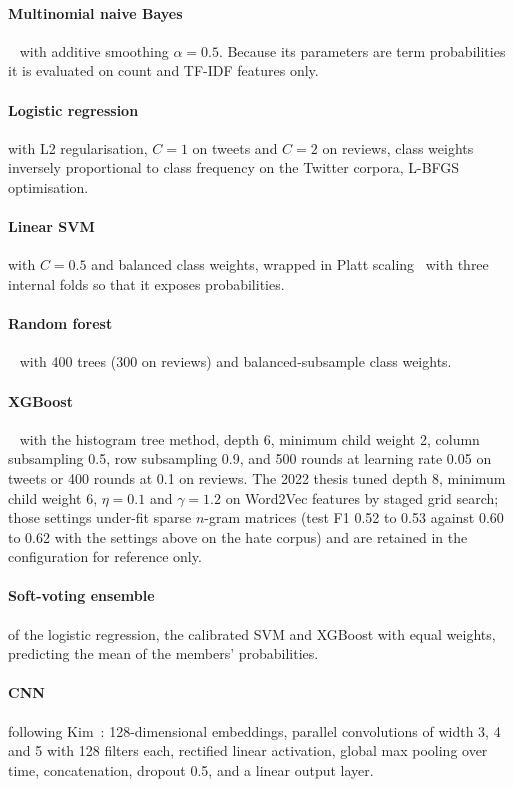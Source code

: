 \paragraph{Multinomial naive Bayes}~\cite{mccallum1998} with additive smoothing $\alpha = 0.5$. Because its parameters are term probabilities it is evaluated on count and TF-IDF features only.

\paragraph{Logistic regression} with L2 regularisation, $C = 1$ on tweets and $C = 2$ on reviews, class weights inversely proportional to class frequency on the Twitter corpora, L-BFGS optimisation.

\paragraph{Linear SVM} with $C = 0.5$ and balanced class weights, wrapped in Platt scaling~\cite{platt1999} with three internal folds so that it exposes probabilities.

\paragraph{Random forest}~\cite{breiman2001} with 400 trees (300 on reviews) and balanced-subsample class weights.

\paragraph{XGBoost}~\cite{chen2016} with the histogram tree method, depth 6, minimum child weight 2, column subsampling 0.5, row subsampling 0.9, and 500 rounds at learning rate 0.05 on tweets or 400 rounds at 0.1 on reviews. The 2022 thesis tuned depth 8, minimum child weight 6, $\eta = 0.1$ and $\gamma = 1.2$ on Word2Vec features by staged grid search; those settings under-fit sparse $n$-gram matrices (test F1 0.52 to 0.53 against 0.60 to 0.62 with the settings above on the hate corpus) and are retained in the configuration for reference only.

\paragraph{Soft-voting ensemble} of the logistic regression, the calibrated SVM and XGBoost with equal weights, predicting the mean of the members' probabilities.

\paragraph{CNN} following Kim~\cite{kim2014}: 128-dimensional embeddings, parallel convolutions of width 3, 4 and 5 with 128 filters each, rectified linear activation, global max pooling over time, concatenation, dropout 0.5, and a linear output layer.

